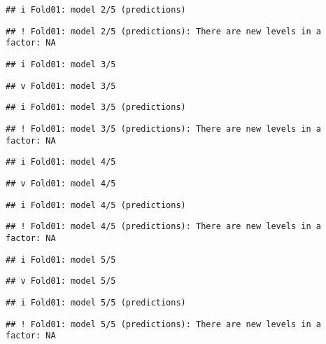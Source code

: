 \documentclass[
]{article}
\begin{document}
\begin{verbatim}
## i Fold01: model 2/5 (predictions)
\end{verbatim}

\begin{verbatim}
## ! Fold01: model 2/5 (predictions): There are new levels in a factor: NA
\end{verbatim}

\begin{verbatim}
## i Fold01: model 3/5
\end{verbatim}

\begin{verbatim}
## v Fold01: model 3/5
\end{verbatim}

\begin{verbatim}
## i Fold01: model 3/5 (predictions)
\end{verbatim}

\begin{verbatim}
## ! Fold01: model 3/5 (predictions): There are new levels in a factor: NA
\end{verbatim}

\begin{verbatim}
## i Fold01: model 4/5
\end{verbatim}

\begin{verbatim}
## v Fold01: model 4/5
\end{verbatim}

\begin{verbatim}
## i Fold01: model 4/5 (predictions)
\end{verbatim}

\begin{verbatim}
## ! Fold01: model 4/5 (predictions): There are new levels in a factor: NA
\end{verbatim}

\begin{verbatim}
## i Fold01: model 5/5
\end{verbatim}

\begin{verbatim}
## v Fold01: model 5/5
\end{verbatim}

\begin{verbatim}
## i Fold01: model 5/5 (predictions)
\end{verbatim}

\begin{verbatim}
## ! Fold01: model 5/5 (predictions): There are new levels in a factor: NA
\end{verbatim}
\end{document}
